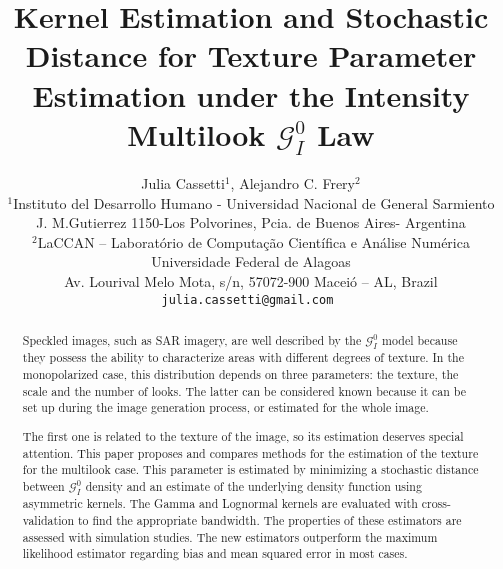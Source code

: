 \documentclass[a4paper]{article} %
\date{} %
\begin{document}
\thispagestyle{empty}

\title{\textbf{Kernel Estimation and Stochastic Distance for Texture Parameter Estimation under the Intensity Multilook $\mathcal G_I^0$ Law}}

\author{Julia Cassetti{\small $^1$}, Alejandro C. Frery{\small $^2$}\\ %
	{\small $^1$Instituto del Desarrollo Humano -  Universidad Nacional de General Sarmiento} \\
	{\small J. M.Gutierrez 1150-Los Polvorines, Pcia. de Buenos Aires- Argentina}\\\small 
	$^2$LaCCAN -- Laborat\'orio de Computa\c c\~ao Cient\'ifica e An\'alise Num\'erica\\
	\small Universidade Federal de Alagoas\\
	\small Av. Lourival Melo Mota, s/n, 57072-900 Macei\'o -- AL, Brazil\\
	\tt{julia.cassetti@gmail.com} %
}%

\date{} %
\maketitle\thispagestyle{empty} %


\begin{abstract}
Speckled images, such as SAR imagery, are well described by the $\mathcal G_I^0$ model because they possess the ability to characterize areas with different degrees of texture. 
In the monopolarized case, this distribution depends on three parameters: the texture, the scale and the number of looks.
The latter can be considered known because it can be set up during the image generation process, or estimated for the whole image.

The first one is related to the texture of the image, so its estimation deserves special attention.
This paper proposes and compares methods for the estimation of the texture for the multilook case. 
This parameter is estimated by minimizing a stochastic distance between $\mathcal G_I^0$ density and an estimate of the underlying density function using asymmetric kernels.
The Gamma and Lognormal kernels are evaluated with cross-validation to find the appropriate bandwidth.
The properties of these estimators are assessed with simulation studies. 
The new estimators outperform the maximum likelihood estimator regarding bias and mean squared error in most cases.
\end{abstract}
\end{document}
